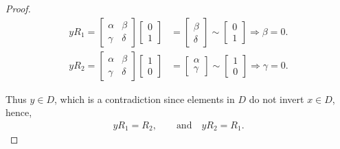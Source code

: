 \begin{proof}
\begin{align*} y R_1 = \begin{bmatrix} \alpha & \beta \\ \gamma & \delta \end{bmatrix} \begin{bmatrix} 0 \\ 1 \end{bmatrix} &= \begin{bmatrix} \beta \\ \delta \end{bmatrix} \sim \begin{bmatrix} 0 \\ 1 \end{bmatrix} \Longrightarrow \beta = 0.
\\[1.5ex] y R_2 = \begin{bmatrix} \alpha & \beta \\ \gamma & \delta \end{bmatrix} \begin{bmatrix} 1 \\ 0 \end{bmatrix} &= \begin{bmatrix} \alpha \\ \gamma \end{bmatrix} \sim \begin{bmatrix} 1 \\ 0 \end{bmatrix} \Longrightarrow \gamma = 0.
\end{align*}

Thus $y \in D$, which is a contradiction since elements in $D$ do not invert $x \in D$, hence,
\begin{align}\label{yinterchange} y R_1 = R_2, \qquad \text{and} \quad y R_2 = R_1.
\end{align}
 

\end{proof}
